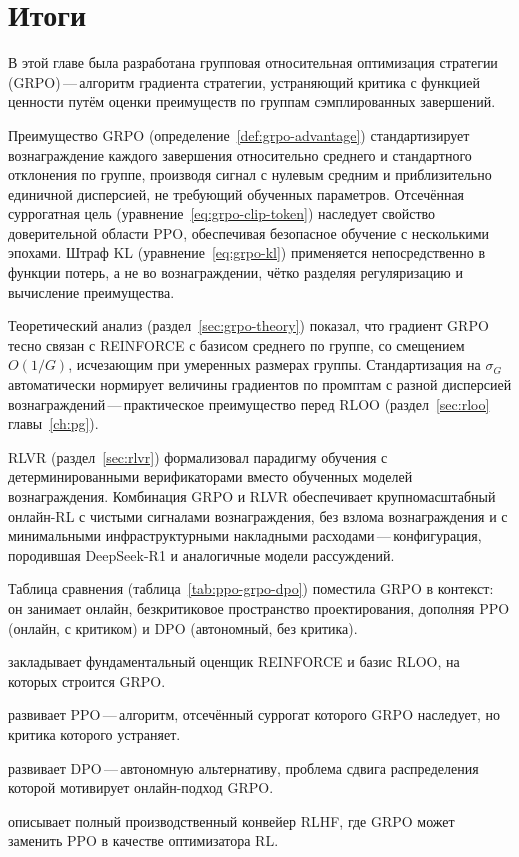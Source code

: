 \section{Итоги}
\label{sec:grpo-summary}

В этой главе была разработана групповая относительная оптимизация стратегии (GRPO)\,---\,алгоритм градиента стратегии, устраняющий критика с функцией ценности путём оценки преимуществ по группам сэмплированных завершений.

Преимущество GRPO (определение~\ref{def:grpo-advantage}) стандартизирует вознаграждение каждого завершения относительно среднего и стандартного отклонения по группе, производя сигнал с нулевым средним и приблизительно единичной дисперсией, не требующий обученных параметров. Отсечённая суррогатная цель (уравнение~\eqref{eq:grpo-clip-token}) наследует свойство доверительной области PPO, обеспечивая безопасное обучение с несколькими эпохами. Штраф KL (уравнение~\eqref{eq:grpo-kl}) применяется непосредственно в функции потерь, а не во вознаграждении, чётко разделяя регуляризацию и вычисление преимущества.

Теоретический анализ (раздел~\ref{sec:grpo-theory}) показал, что градиент GRPO тесно связан с REINFORCE с базисом среднего по группе, со смещением $O(1/G)$, исчезающим при умеренных размерах группы. Стандартизация на $\sigma_G$ автоматически нормирует величины градиентов по промптам с разной дисперсией вознаграждений\,---\,практическое преимущество перед RLOO (раздел~\ref{sec:rloo} главы~\ref{ch:pg}).

RLVR (раздел~\ref{sec:rlvr}) формализовал парадигму обучения с детерминированными верификаторами вместо обученных моделей вознаграждения. Комбинация GRPO и RLVR обеспечивает крупномасштабный онлайн-RL с чистыми сигналами вознаграждения, без взлома вознаграждения и с минимальными инфраструктурными накладными расходами\,---\,конфигурация, породившая DeepSeek-R1 и аналогичные модели рассуждений.

Таблица сравнения (таблица~\ref{tab:ppo-grpo-dpo}) поместила GRPO в контекст: он занимает онлайн, безкритиковое пространство проектирования, дополняя PPO (онлайн, с критиком) и DPO (автономный, без критика).

\begin{description}[leftmargin=!,labelwidth=3.5cm]
  \item[Глава~\ref{ch:pg}] закладывает фундаментальный оценщик REINFORCE и базис RLOO, на которых строится GRPO.
  \item[Глава~\ref{ch:actor-critic}] развивает PPO\,---\,алгоритм, отсечённый суррогат которого GRPO наследует, но критика которого устраняет.
  \item[Глава~\ref{ch:dpo}] развивает DPO\,---\,автономную альтернативу, проблема сдвига распределения которой мотивирует онлайн-подход GRPO.
  \item[Глава~\ref{ch:practical-rlhf}] описывает полный производственный конвейер RLHF, где GRPO может заменить PPO в качестве оптимизатора RL.
\end{description}

